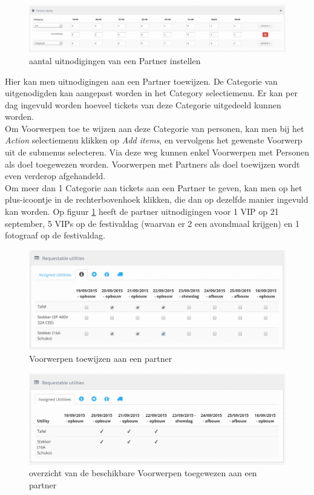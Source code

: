 \documentclass[]{memoir}
\begin{document}
\begin{figure}[H]
	\includegraphics[width=\linewidth]{addPartner_date}
	\caption{aantal uitnodigingen van een Partner instellen}
	\label{img:Partnerdate}
\end{figure}
Hier kan men uitnodigingen aan een Partner toewijzen. De Categorie van uitgenodigden kan aangepast worden in het Category selectiemenu. Er kan per dag ingevuld worden hoeveel tickets van deze Categorie uitgedeeld kunnen worden. \\  Om Voorwerpen toe te wijzen aan deze Categorie van personen, kan men bij het \textsl{Action} selectiemenu klikken op \textsl{Add items}, en vervolgens het gewenste Voorwerp uit de submenus selecteren. Via deze weg kunnen enkel Voorwerpen met Personen als doel toegewezen worden. Voorwerpen met Partners als doel toewijzen wordt even verderop afgehandeld. \\
Om meer dan 1 Categorie aan tickets aan een Partner te geven, kan men op het plus-icoontje in de rechterbovenhoek klikken, die dan op dezelfde manier ingevuld kan worden. 
Op figuur \ref{img:Partnerdate} heeft de  partner uitnodigingen voor 1 VIP op 21 september, 5 VIPs op de festivaldag (waarvan er 2 een avondmaal krijgen) en 1 fotograaf op de festivaldag.
\begin{figure}[H]
	\includegraphics[width=\linewidth]{addPartner_utilities}
	\caption{Voorwerpen toewijzen aan een partner}
\end{figure}

\begin{figure}[H]
	\includegraphics[width=\linewidth]{addPartner_utilities_main}
	\caption{overzicht van de beschikbare Voorwerpen toegewezen aan een partner}
\end{figure}
\end{document}
